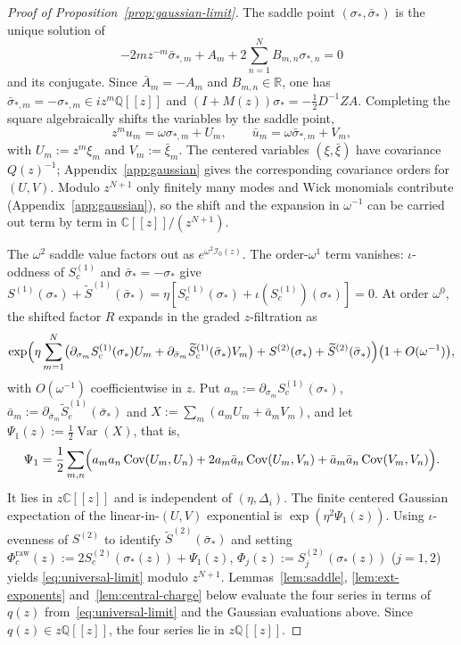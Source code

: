 \documentclass[twoside,10pt]{article}
\numberwithin{equation}{section}
\theoremstyle{slbody}
\theoremstyle{definition}
\theoremstyle{remark}
\begin{document}
\begin{proof}[Proof of Proposition~\ref{prop:gaussian-limit}]
The saddle point \((\sigma_*,\bar\sigma_*)\) is the unique solution of
\[
 -2mz^{-m}\bar\sigma_{*,m}+A_m+2\sum_{n=1}^N B_{m,n}\sigma_{*,n}=0
\]
and its conjugate.  Since \(\bar A_m=-A_m\) and \(B_{m,n}\in\mathbb R\), one has
\(\bar\sigma_{*,m}=-\sigma_{*,m}\in iz^m\mathbb Q[[z]]\) and
\((I+M(z))\sigma_*=-\frac12 D^{-1}ZA\).  Completing the square algebraically
shifts the variables by the saddle point,
\[
 z^m u_m=\omega\sigma_{*,m}+U_m,\qquad \bar u_m=\omega\bar\sigma_{*,m}+V_m,
\]
with \(U_m:=z^m\xi_m\) and \(V_m:=\bar\xi_m\).  The centered variables
\((\xi,\bar\xi)\) have covariance \(Q(z)^{-1}\); Appendix~\ref{app:gaussian}
gives the corresponding covariance orders for \((U,V)\).  Modulo \(z^{N+1}\) only
finitely many modes and Wick monomials contribute (Appendix~\ref{app:gaussian}),
so the shift and the expansion in \(\omega^{-1}\) can be carried out term by
term in \(\mathbb C[[z]]/(z^{N+1})\).

The \(\omega^2\) saddle value factors out as \(e^{\omega^2\mathcal I_0(z)}\).
The order-\(\omega^1\) term vanishes: \(\iota\)-oddness of
\(S^{(1)}_c\) and \(\bar\sigma_*=-\sigma_*\) give
\(S^{(1)}(\sigma_*)+\widetilde S^{(1)}(\bar\sigma_*)
=\eta[S^{(1)}_c(\sigma_*)+\iota(S^{(1)}_c)(\sigma_*)]=0\).  At order \(\omega^0\), the shifted factor \(R\) expands in the
graded \(z\)-filtration as
\[
 \exp\Bigl(\eta\sum_{m=1}^N\bigl(\partial_{\sigma_m}S^{(1)}_c(\sigma_*)U_m
 +\partial_{\bar\sigma_m}\widetilde S^{(1)}_c(\bar\sigma_*)V_m\bigr)
 +S^{(2)}(\sigma_*)+\widetilde S^{(2)}(\bar\sigma_*)\Bigr)\bigl(1+O(\omega^{-1})\bigr),
\]
with \(O(\omega^{-1})\) coefficientwise in \(z\).  Put
\(a_m:=\partial_{\sigma_m}S^{(1)}_c(\sigma_*)\),
\(\bar a_m:=\partial_{\bar\sigma_m}\widetilde S^{(1)}_c(\bar\sigma_*)\) and
\(X:=\sum_m(a_mU_m+\bar a_mV_m)\), and let
\(\Psi_1(z):=\frac12\operatorname{Var}(X)\), that is,
\[
 \Psi_1=\frac12\sum_{m,n}\Bigl(a_ma_n\operatorname{Cov}(U_m,U_n)
 +2a_m\bar a_n\operatorname{Cov}(U_m,V_n)
 +\bar a_m\bar a_n\operatorname{Cov}(V_m,V_n)\Bigr).
\]
It lies in \(z\mathbb C[[z]]\) and is independent of \((\eta,\Delta_i)\).  The finite
centered Gaussian expectation of the linear-in-\((U,V)\) exponential is
\(\exp(\eta^2\Psi_1(z))\).  Using \(\iota\)-evenness of \(S^{(2)}\) to identify
\(\widetilde S^{(2)}(\bar\sigma_*)\) and setting
\(\Phi_c^{\mathrm{raw}}(z):=2S^{(2)}_c(\sigma_*(z))+\Psi_1(z)\),
\(\Phi_j(z):=S^{(2)}_j(\sigma_*(z))\) (\(j=1,2\)) yields
\eqref{eq:universal-limit} modulo \(z^{N+1}\).  Lemmas~\ref{lem:saddle}, \ref{lem:ext-exponents}
and~\ref{lem:central-charge} below evaluate the four series in terms of \(q(z)\)
from~\eqref{eq:universal-limit} and the Gaussian evaluations above.  Since
\(q(z)\in z\mathbb Q[[z]]\), the four series lie in \(z\mathbb Q[[z]]\).
\end{proof}
\end{document}

